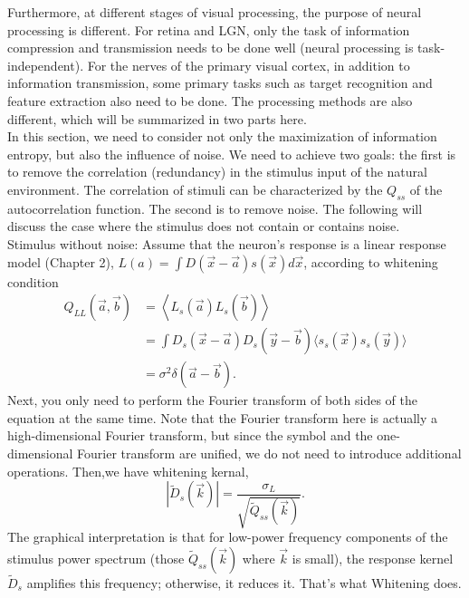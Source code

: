 Furthermore, at different stages of visual processing, the purpose of
neural processing is different. For retina and LGN, only the task of
information compression and transmission needs to be done well (neural
processing is task-independent). For the nerves of the primary visual
cortex, in addition to information transmission, some primary tasks
such as target recognition and feature extraction also need to be
done. The processing methods are also different, which will be
summarized in two parts here.\\

In this section, we need to consider not only the maximization of
information entropy, but also the influence of noise. We need to
achieve two goals: the first is to remove the correlation (redundancy)
in the stimulus input of the natural environment. The correlation of
stimuli can be characterized by the $Q_{ss}$ of the autocorrelation
function. The second is to remove noise. The following will discuss
the case where the stimulus does not contain or contains noise.\\
Stimulus without noise:
Assume that the neuron's response is a linear response model (Chapter
2), $L(a)=\int D(\vec{x}-\vec{a})s(\vec{x})d\vec{x}$, according to whitening condition
\begin{equation}
  \begin{aligned}
    Q_{LL} (\vec{a},\vec{b})    &=\left<
    L_s (\vec{a})L_s (\vec{b})  
       \right>\\
    &=\int D_s (\vec{x}-\vec{a})
       D_s (\vec{y}-\vec{b})
       \langle s_s (\vec{x})
       s_s (\vec{y})   \rangle \\
    &=\sigma^2\delta(\vec{a}-\vec{b}).
  \label{equ:4.36}
  \end{aligned}
\end{equation}
Next, you only need to perform the Fourier transform of both sides of
the equation at the same time. Note that the Fourier transform here is
actually a high-dimensional Fourier transform, but since the symbol
and the one-dimensional Fourier transform are unified, we do not need
to introduce additional operations. Then,we have whitening kernal,
\begin{equation}
  \label{eq: 4.42}
   \left\lvert \tilde{D}_s (\vec{k })    \right\rvert = \frac{\sigma _L}{\sqrt{\tilde{Q}_{ss} (\vec{k})  } }.
\end{equation}
The graphical interpretation is that for low-power frequency
components of the stimulus power spectrum (those
$\tilde{Q}_{ss} (\vec{k})$ where $\vec{k}$ is small), the
  response kernel $\tilde{D}_s$ amplifies this frequency;
  otherwise, it reduces it. That's what Whitening does.\\
  
